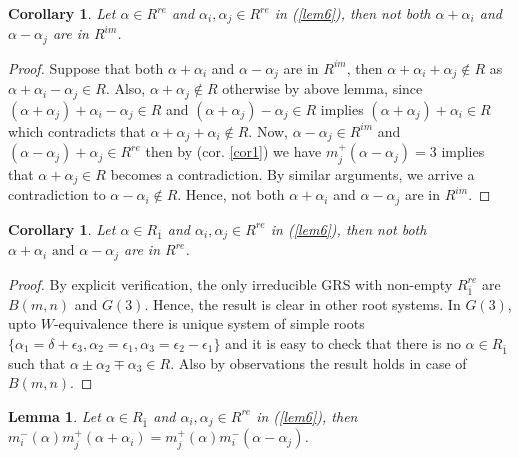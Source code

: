 \documentclass[11pt]{amsart}
\theoremstyle{plain}
\newtheorem{lemma}[thm]{Lemma}
\newtheorem{cor}[thm]{Corollary}
\theoremstyle{definition}
\numberwithin{equation}{section}
\newcommand{\al}{\alpha}
\newcommand{\del}{\delta}
\newcommand{\ep}{\epsilon}
\begin{document}
	\begin{cor}
	Let $\al\in R^{re}$ and $\al_i,\al_j\in R^{re}$ in (\ref{lem6}), then not both $\al+\al_i$ and $\al-\al_j$ are in $R^{im}$.
	\end{cor}
	\begin{proof}
	Suppose that both $\al+\al_i$ and $\al-\al_j$ are in $R^{im}$, then $\al+\al_i+\al_j\notin R$ as $\al+\al_i-\al_j\in R$. Also, $\al+\al_j\notin R$ otherwise by above lemma, since $(\al+\al_j)+\al_i-\al_j\in R$ and $(\al+\al_j)-\al_j\in R$ implies $(\al+\al_j)+\al_i\in R$ which contradicts that $\al+\al_j+\al_i\notin R$. Now, $\al-\al_j\in R^{im}$ and $(\al-\al_j)+\al_j\in R^{re}$ then by (cor. \ref{cor1}) we have $m_j^+(\al-\al_j)=3$ implies that $\al+\al_j\in R$ becomes a contradiction. By similar arguments, we arrive a contradiction to $\al-\al_i\notin R$. Hence, not both $\al+\al_i$ and $\al-\al_j$ are in $R^{im}$.
	\end{proof}
	\begin{cor}
	Let $\al\in R_{\bar{1}}$ and $\al_i,\al_j\in R^{re}$ in (\ref{lem6}), then not both $\al+\al_i\text{ and }\al-\al_j$ are in $R^{re}$.
	\end{cor}
	\begin{proof}
	By explicit verification, the only irreducible GRS with non-empty $R_{\bar{1}}^{re}$ are $B(m,n)$ and $G(3)$. Hence, the result is clear in other root systems. In $G(3)$, upto $W$-equivalence there is unique system of simple roots $\{\al_1=\del+\ep_3,\al_2=\ep_1,\al_3=\ep_2-\ep_1\}$ and it is easy to check that there is no $\al\in R_{\bar{1}}$ such that $\al\pm\al_2\mp\al_3\in R$. Also by observations the result holds in case of $B(m,n)$.
	\end{proof}
	\begin{lemma}\label{lem12}
		 Let $\al\in R_{\bar{1}}$ and $\al_i,\al_j\in R^{re}$ in (\ref{lem6}), then $m_i^-(\al)m_j^+(\al+\al_i)=m_j^+(\al)m_i^-(\al-\al_j)$.
	\end{lemma}
\end{document}

